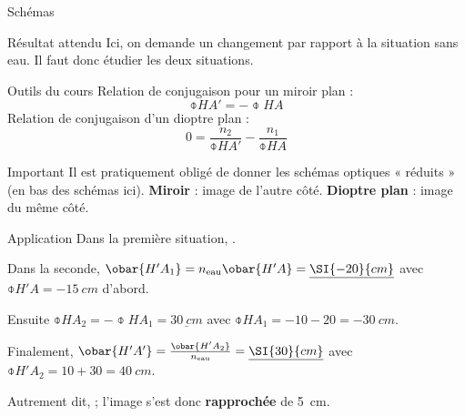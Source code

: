 \documentclass[../main/main.tex]{subfiles}
\begin{document}
\begin{tcbraster}[raster columns=4, raster equal height=rows]
\begin{NCdefi}[raster multicolumn=3, sidebyside]{Schémas}
\begin{center}
        \end{center}
    \end{NCdefi}
    \begin{tcolorbox}[blankest, raster multicolumn=1, space to=\myspace]
        \begin{tcbraster}[raster columns=1]
            \begin{NCprop}[add to natural height=\myspace]{Résultat attendu}
                Ici, on demande un changement par rapport à la situation sans
                eau. Il faut donc étudier les deux situations.
            \end{NCprop}
            \begin{NCdemo}{Outils du cours}
                Relation de conjugaison pour un miroir plan :
                \[\obar{HA'} = - \obar{HA}\]
                Relation de conjugaison d'un dioptre plan :
                \[ 0 = \frac{n_2}{\obar{HA'}} - \frac{n_1}{\obar{HA}} \]
            \end{NCdemo}
            \begin{NCror}{Important}
                Il est pratiquement obligé de donner les schémas optiques
                « réduits » (en bas des schémas ici).\smallbreak
                \textbf{Miroir} : image de l'autre côté.\smallbreak
                \textbf{Dioptre plan} : image du même côté.
            \end{NCror}
        \end{tcbraster}
    \end{tcolorbox}
\end{tcbraster}
\begin{NCexem}[sidebyside]{Application}
    Dans la première situation, .
    \tcblower

    Dans la seconde, $\obar{H'A_1} = n_{\rm eau}\obar{H'A} =
    \underline{\SI{-20}{cm}}$ avec $\obar{H'A} = \SI{-15}{cm}$
    d'abord.\smallbreak

    Ensuite $\obar{HA_2} = -\obar{HA_1} = \underline{\SI{30}{cm}}$ avec
    $\obar{HA_1} = -10-20 = \SI{-30}{cm}$.\smallbreak

    Finalement, $\obar{H'A'} = \frac{\obar{H'A_2}}{n_{\rm eau}} =
    \underline{\SI{30}{cm}}$ avec $\obar{H'A_2} = 10+30 =
    \SI{40}{cm}$.\smallbreak

    Autrement dit,  ; l'image s'est donc
    \textbf{rapprochée} de \SI{5}{cm}.
\end{NCexem}
\end{document}

